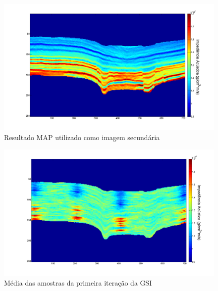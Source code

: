\begin{figure}[htp]
\begin{center}
  \includegraphics[width=\textwidth]{fig/map}
  \caption{Resultado MAP utilizado como imagem secundária}
  \label{fig:mapResult}
\end{center}
\end{figure}


\begin{figure}[htp]
\begin{center}
  \includegraphics[width=\textwidth]{fig/dss1it-20realz}
  \caption{Média das amostras da primeira iteração da GSI}
  \label{fig:dssresult}
\end{center}
\end{figure}

